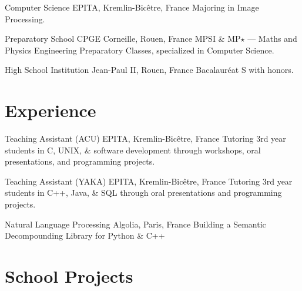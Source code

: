 \documentclass[letterpaper]{twentysecondcv} %
\begin{document}
\begin{twenty} %

    {Computer Science}
    {EPITA, Kremlin-Bicêtre, France}
    {Majoring in Image Processing.}

    {Preparatory School}
    {CPGE Corneille, Rouen, France}
    {MPSI \& MP$\star$ --- Maths and Physics Engineering Preparatory Classes,
    specialized in Computer Science.}

    {High School}
    {Institution Jean-Paul II, Rouen, France}
    {Bacalauréat S with honors.}

\end{twenty}


\section{Experience}

\begin{twenty}

    {Teaching Assistant (ACU)}
    {EPITA, Kremlin-Bicêtre, France}
    {Tutoring 3rd year students in C, UNIX, \& software development through
    workshops, oral presentations, and programming projects.}

    {Teaching Assistant (YAKA)}
    {EPITA, Kremlin-Bicêtre, France}
    {Tutoring 3rd year students in C++, Java, \& SQL through oral presentations
    and programming projects.}

    {Natural Language Processing}
    {Algolia, Paris, France}
    {Building a Semantic Decompounding Library for Python \& C++}

\end{twenty}



\section{School Projects}
\end{document}
